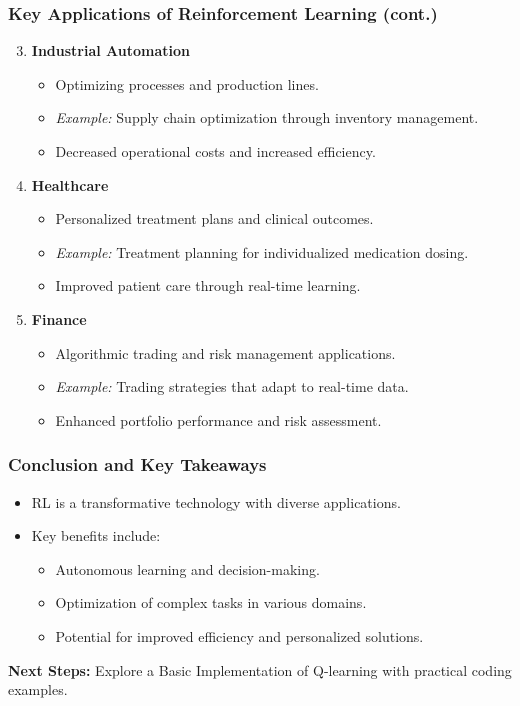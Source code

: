 \documentclass[aspectratio=169]{beamer}
\begin{document}
\begin{frame}[fragile]
    \frametitle{Key Applications of Reinforcement Learning (cont.)}
    \begin{enumerate}
        \setcounter{enumi}{2}
        \item \textbf{Industrial Automation}
            \begin{itemize}
                \item Optimizing processes and production lines.
                \item \textit{Example:} Supply chain optimization through inventory management.
                \item Decreased operational costs and increased efficiency.
            \end{itemize}
        
        \item \textbf{Healthcare}
            \begin{itemize}
                \item Personalized treatment plans and clinical outcomes.
                \item \textit{Example:} Treatment planning for individualized medication dosing.
                \item Improved patient care through real-time learning.
            \end{itemize}
        
        \item \textbf{Finance}
            \begin{itemize}
                \item Algorithmic trading and risk management applications.
                \item \textit{Example:} Trading strategies that adapt to real-time data.
                \item Enhanced portfolio performance and risk assessment.
            \end{itemize}
    \end{enumerate}
\end{frame}

\begin{frame}[fragile]
    \frametitle{Conclusion and Key Takeaways}
    \begin{itemize}
        \item RL is a transformative technology with diverse applications.
        \item Key benefits include:
            \begin{itemize}
                \item Autonomous learning and decision-making.
                \item Optimization of complex tasks in various domains.
                \item Potential for improved efficiency and personalized solutions.
            \end{itemize}
    \end{itemize}
    \textbf{Next Steps:} Explore a Basic Implementation of Q-learning with practical coding examples.
\end{frame}
\end{document}
